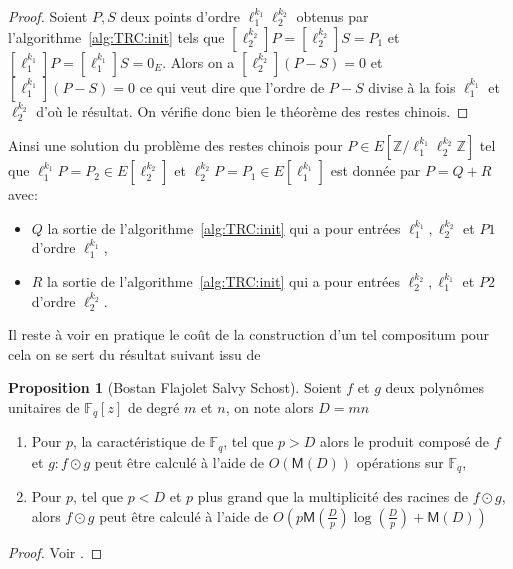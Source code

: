 \documentclass[10pt,a4paper]{book}
\theoremstyle{plain}
\theoremstyle{definition}
\theoremstyle{definition}
\theoremstyle{definition}
\newtheorem{prop}[thm]{Proposition}
\theoremstyle{definition}
\theoremstyle{remark}
\theoremstyle{remark}
\theoremstyle{definition}
\begin{document}
\begin{proof}
Soient $P,S$ deux points d'ordre $\ell_1^{k_1}\ell_2^{k_2}$  obtenus par 
l'algorithme~\ref{alg:TRC:init}  tels que 
$[\ell_2^{k_2}]P=[\ell_2^{k_2}]S=P_1$ et  
$[\ell_1^{k_1}]P=[\ell_1^{k_1}]S=0_E$. Alors on a $[\ell_2^{k_2}](P-S)=0$ et 
$[\ell_1^{k_1}](P-S)=0$ ce qui veut dire que l'ordre de $P-S$ divise à la fois 
$\ell_1^{k_1}$ et $\ell_2^{k_2}$ d'où le résultat. On vérifie donc bien le 
théorème des restes chinois.
\end{proof}

Ainsi une solution du problème des restes chinois pour $P \in E[\mathbb{Z}/
\ell_1^{k_1} \ell_2^{k_2}\mathbb{Z}]$ tel que $\ell_1^{k_1}P=P_2 \in 
E[\ell_2^{k_2}]$ et $\ell_2^{k_2}P=P_1 \in E[\ell_1^{k_1}]$ est donnée par 
$P=Q+R$ avec:
\begin{itemize}
\item $Q$ la sortie de l'algorithme~\ref{alg:TRC:init} qui a pour entrées
$\ell_1^{k_1}, \ell_2^{k_2}$ et $P1$ d'ordre $\ell_1^{k_1}$,
\item  $R$ la sortie de l'algorithme~\ref{alg:TRC:init} qui a pour entrées
$\ell_2^{k_2}, \ell_1^{k_1}$ et $P2$ d'ordre $\ell_2^{k_2}$.
\end{itemize}

Il reste à voir en pratique le coût de la construction d'un tel compositum pour 
cela on se sert du résultat suivant issu de \cite[Theorem 1]{BostanFlajoletSalvySchost06}

\begin{prop}[Bostan Flajolet Salvy Schost]
\label{pro:comp:prod}
Soient $f$ et $g$ deux polynômes unitaires de $\mathbb{F}_q[z]$ de degré $m$ et $n$, on note alors $D=mn$
\begin{enumerate}
\item Pour $p$, la caractéristique de $\mathbb{F}_q$, tel que $p>D$ alors le produit composé de $f$ et $g: f \odot g$ peut être calculé à l'aide de  $O(\mathsf{M}(D))$ opérations sur $\mathbb{F}_q$,
\item Pour $p$, tel que $p<D$ et $p$ plus grand que la multiplicité des racines de $f \odot g$, alors $f \odot g$ peut être calculé à l'aide de $O(p\mathsf{M}(\frac{D}{p})\log(\frac{D}{p})+\mathsf{M}(D))$
\end{enumerate}
\end{prop}

\begin{proof}
Voir \cite{BostanFlajoletSalvySchost06}.
\end{proof}
\end{document}
